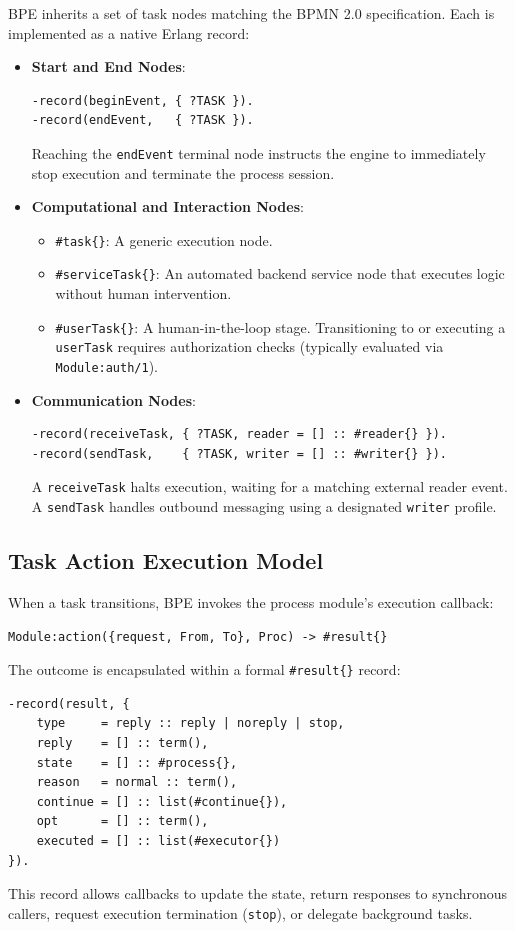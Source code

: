 \documentclass[11pt,a4paper]{article}
\begin{document}
BPE inherits a set of task nodes matching the BPMN 2.0 specification. Each is implemented as a native Erlang record:
\begin{itemize}
    \item \textbf{Start and End Nodes}:
    \begin{lstlisting}
-record(beginEvent, { ?TASK }).
-record(endEvent,   { ?TASK }).
    \end{lstlisting}
    Reaching the \texttt{endEvent} terminal node instructs the engine to immediately stop execution and terminate the process session.
    
    \item \textbf{Computational and Interaction Nodes}:
    \begin{itemize}
        \item \texttt{\#task\{\}}: A generic execution node.
        \item \texttt{\#serviceTask\{\}}: An automated backend service node that executes logic without human intervention.
        \item \texttt{\#userTask\{\}}: A human-in-the-loop stage. Transitioning to or executing a \texttt{userTask} requires authorization checks (typically evaluated via \texttt{Module:auth/1}).
    \end{itemize}
    
    \item \textbf{Communication Nodes}:
    \begin{lstlisting}
-record(receiveTask, { ?TASK, reader = [] :: #reader{} }).
-record(sendTask,    { ?TASK, writer = [] :: #writer{} }).
    \end{lstlisting}
    A \texttt{receiveTask} halts execution, waiting for a matching external reader event. A \texttt{sendTask} handles outbound messaging using a designated \texttt{writer} profile.
\end{itemize}

\subsection{Task Action Execution Model}

When a task transitions, BPE invokes the process module's execution callback:
\begin{lstlisting}
Module:action({request, From, To}, Proc) -> #result{}
\end{lstlisting}
The outcome is encapsulated within a formal \texttt{\#result\{\}} record:
\begin{lstlisting}
-record(result, {
    type     = reply :: reply | noreply | stop,
    reply    = [] :: term(),
    state    = [] :: #process{},
    reason   = normal :: term(),
    continue = [] :: list(#continue{}),
    opt      = [] :: term(),
    executed = [] :: list(#executor{})
}).
\end{lstlisting}
This record allows callbacks to update the state, return responses to synchronous callers, request execution termination (\texttt{stop}), or delegate background tasks.
\end{document}
